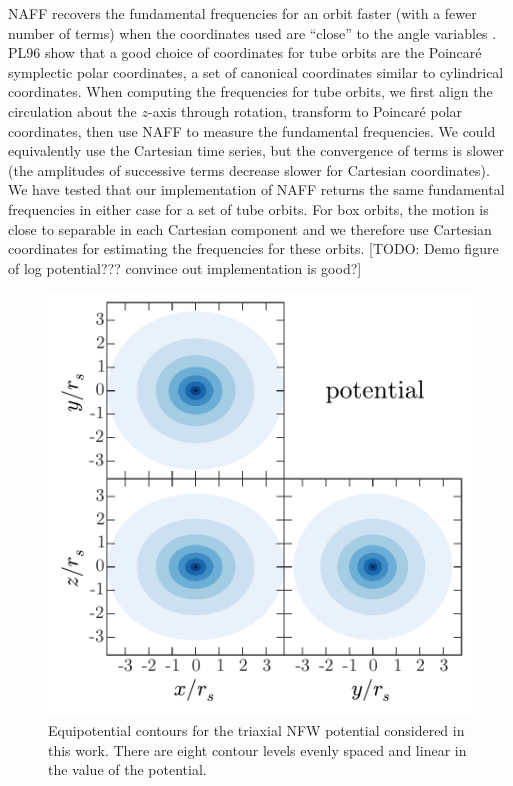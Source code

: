 \documentclass[letterpaper,12pt,preprint]{aastex}
\begin{document}
NAFF recovers the fundamental frequencies for an orbit faster (with a fewer number of terms) when the coordinates used are ``close'' to the angle variables \cite[PL96;][]{papaphilippou96}. PL96 show that a good choice of coordinates for tube orbits are the Poincar\'e symplectic polar coordinates, a set of canonical coordinates similar to cylindrical coordinates. When computing the frequencies for tube orbits, we first align the circulation about the $z$-axis through rotation, transform to Poincar\'e polar coordinates, then use NAFF to measure the fundamental frequencies. We could equivalently use the Cartesian time series, but the convergence of terms is slower (the amplitudes of successive terms decrease slower for Cartesian coordinates). We have tested that our implementation of NAFF returns the same fundamental frequencies in either case for a set of tube orbits. For box orbits, the motion is close to separable in each Cartesian component and we therefore use Cartesian coordinates for estimating the frequencies for these orbits. [TODO: Demo figure of log potential??? convince out implementation is good?]

\begin{figure}[!p]
\begin{center}
\includegraphics[width=\textwidth]{figures/potential.pdf}
\caption{Equipotential contours for the triaxial NFW potential considered in this work. There are eight contour levels evenly spaced and linear in the value of the potential. } \label{fig:potential}
\end{center}
\end{figure}
\end{document}
